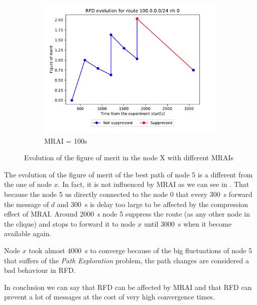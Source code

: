 \begin{figure}[h]
     \hfill
     \begin{subfigure}[b]{0.3\textwidth}
         \centering
         \includegraphics[width=\textwidth]{images/RFD/clique/FigureOfMerit/mrai21_RFD_5_rfd_R1.pdf}
         \caption{MRAI = 100s}
         \label{fig:clique_5_mrai100}
     \end{subfigure}
        \caption{Evolution of the figure of merit in the node X with different MRAIs}
        \label{fig:clique_node5}
\end{figure}

The evolution of the figure of merit of the best path of node \num{5} is a different
from the one of node $x$.
In fact, it is not influenced by \ac{MRAI} as we can see in .
That because the node \num{5} us directly connected to the node \num{0} that every
\SI{300}{\second} forward the message of $d$ and \SI{300}{\second} is delay 
too large to be affected by the compression effect of \ac{MRAI}.
Around \SI{2000}{\second} node \num{5} suppress the route (as any other node in the
clique) and stops to forward it to node $x$ until \SI{3000}{\second} when it become
available again.

Node $x$ took almost \SI{4000}{\second} to converge because of the big fluctuations
of node \num{5} that suffers of the \textit{Path Exploration} problem, the path
changes are considered a bad behaviour in \ac{RFD}.

In conclusion we can say that \ac{RFD} can be affected by \ac{MRAI} and
that \ac{RFD} can prevent a lot of messages at the cost of very high convergence
times.


